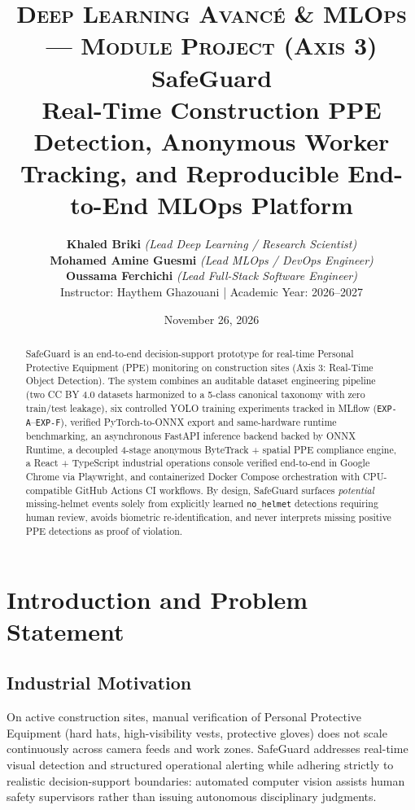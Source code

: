 \documentclass[11pt,a4paper]{article}
\title{
  \vspace{-1cm}
  {\large \textsc{Deep Learning Avancé \& MLOps — Module Project (Axis 3)}}\\[0.4cm]
  \textbf{\Huge SafeGuard}\\[0.25cm]
  {\Large Real-Time Construction PPE Detection, Anonymous Worker Tracking, and Reproducible End-to-End MLOps Platform}
}
\author{
  \textbf{Khaled Briki} \textit{(Lead Deep Learning / Research Scientist)} \\
  \textbf{Mohamed Amine Guesmi} \textit{(Lead MLOps / DevOps Engineer)} \\
  \textbf{Oussama Ferchichi} \textit{(Lead Full-Stack Software Engineer)} \\[0.35cm]
  \small Instructor: Haythem Ghazouani \quad | \quad Academic Year: 2026--2027
}
\date{November 26, 2026}
\begin{document}
\maketitle

\begin{abstract}
\noindent SafeGuard is an end-to-end decision-support prototype for real-time Personal Protective Equipment (PPE) monitoring on construction sites (Axis 3: Real-Time Object Detection). The system combines an auditable dataset engineering pipeline (two CC BY 4.0 datasets harmonized to a 5-class canonical taxonomy with zero train/test leakage), six controlled YOLO training experiments tracked in MLflow (\texttt{EXP-A}--\texttt{EXP-F}), verified PyTorch-to-ONNX export and same-hardware runtime benchmarking, an asynchronous FastAPI inference backend backed by ONNX Runtime, a decoupled 4-stage anonymous ByteTrack + spatial PPE compliance engine, a React + TypeScript industrial operations console verified end-to-end in Google Chrome via Playwright, and containerized Docker Compose orchestration with CPU-compatible GitHub Actions CI workflows. By design, SafeGuard surfaces \emph{potential} missing-helmet events solely from explicitly learned \texttt{no\_helmet} detections requiring human review, avoids biometric re-identification, and never interprets missing positive PPE detections as proof of violation.
\end{abstract}

\tableofcontents
\newpage

\section{Introduction and Problem Statement}

\subsection{Industrial Motivation}
On active construction sites, manual verification of Personal Protective Equipment (hard hats, high-visibility vests, protective gloves) does not scale continuously across camera feeds and work zones. SafeGuard addresses real-time visual detection and structured operational alerting while adhering strictly to realistic decision-support boundaries: automated computer vision assists human safety supervisors rather than issuing autonomous disciplinary judgments.
\end{document}
